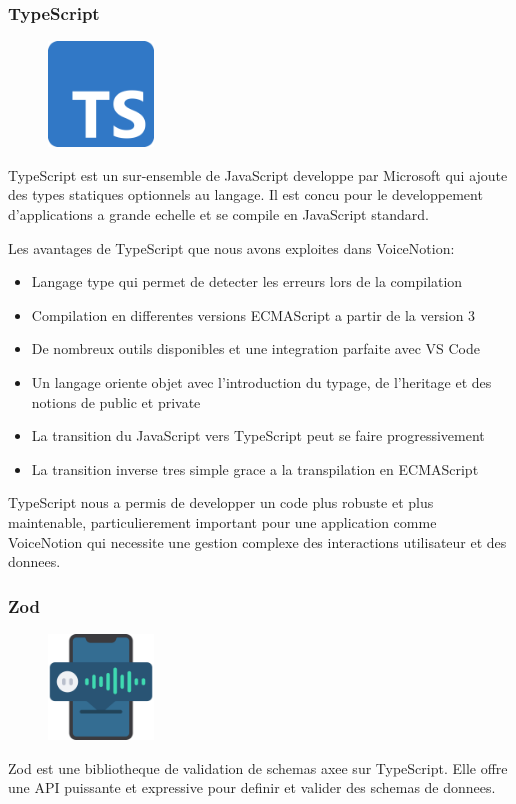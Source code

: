 \subsubsection{TypeScript}
\begin{figure}
    \centering
    \includegraphics[width=0.25\textwidth]{assets/docs/typescript.png}
\end{figure}
TypeScript est un sur-ensemble de JavaScript developpe par Microsoft qui ajoute des types statiques optionnels au langage. Il est concu pour le developpement d'applications a grande echelle et se compile en JavaScript standard.

Les avantages de TypeScript que nous avons exploites dans VoiceNotion:
\begin{itemize}
    \item Langage type qui permet de detecter les erreurs lors de la compilation
    \item Compilation en differentes versions ECMAScript a partir de la version 3
    \item De nombreux outils disponibles et une integration parfaite avec VS Code
    \item Un langage oriente objet avec l'introduction du typage, de l'heritage et des notions de public et private
    \item La transition du JavaScript vers TypeScript peut se faire progressivement
    \item La transition inverse tres simple grace a la transpilation en ECMAScript
\end{itemize}

TypeScript nous a permis de developper un code plus robuste et plus maintenable, particulierement important pour une application comme VoiceNotion qui necessite une gestion complexe des interactions utilisateur et des donnees.

\subsubsection{Zod}
\begin{figure}
    \centering
    \includegraphics[width=0.25\textwidth]{assets/docs/logo_zod.png}
\end{figure}
Zod est une bibliotheque de validation de schemas axee sur TypeScript. Elle offre une API puissante et expressive pour definir et valider des schemas de donnees. 

